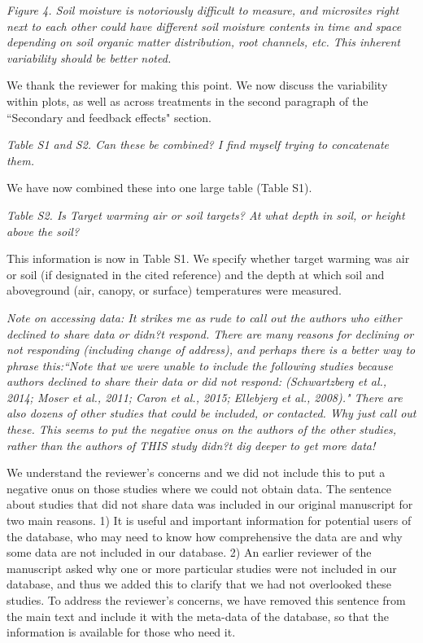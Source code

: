 \documentclass[11pt,a4paper]{letter}
\begin{document}
\par \emph{Figure 4.  Soil moisture is notoriously difficult to measure, and microsites right next to each other could have different soil moisture contents in time and space depending on soil organic matter distribution, root channels, etc.  This inherent variability should be better noted.}
\par We thank the reviewer for making this point. We now discuss the variability within plots, as well as across treatments in the second paragraph of the ``Secondary and feedback effects" section. 

\par \emph{Table S1 and S2.  Can these be combined?  I find myself trying to concatenate them.}
\par We have now combined these into one large table (Table S1).

\par \emph{Table S2.  Is Target warming air or soil targets?  At what depth in soil, or height above the soil?}

\par This information is now in Table S1. We specify whether target warming was air or soil (if designated in the cited reference) and the depth at which soil and aboveground (air, canopy, or surface) temperatures were measured. 

\par \emph{Note on accessing data:  It strikes me as rude to call out the authors who either declined to share data or didn?t respond.  There are many reasons for declining or not responding (including change of address), and perhaps there is a better way to phrase this:``Note that we were unable to include the following studies because authors declined to share their data or did not respond: (Schwartzberg et al., 2014; Moser et al., 2011; Caron et al., 2015; Ellebjerg et al., 2008)." There are also dozens of other studies that could be included, or contacted.  Why just call out these.  This seems to put the negative onus on the authors of the other studies, rather than the authors of THIS study didn?t dig deeper to get more data!}

\par We understand the reviewer's concerns and we did not include this to put a negative onus on those studies where we could not obtain data.  The sentence about studies that did not share data was included in our original manuscript for two main reasons. 1) It is useful and important information for potential users of the database, who may need to know how comprehensive the data are and why some data are not included in our database. 2) An earlier reviewer of the manuscript asked why one or more particular studies were not included in our database, and thus we added this to clarify that we had not overlooked these studies. To address the reviewer's concerns, we have removed this sentence from the main text and include it with the meta-data of the database, so that the information is available for those who need it.
\end{document}
